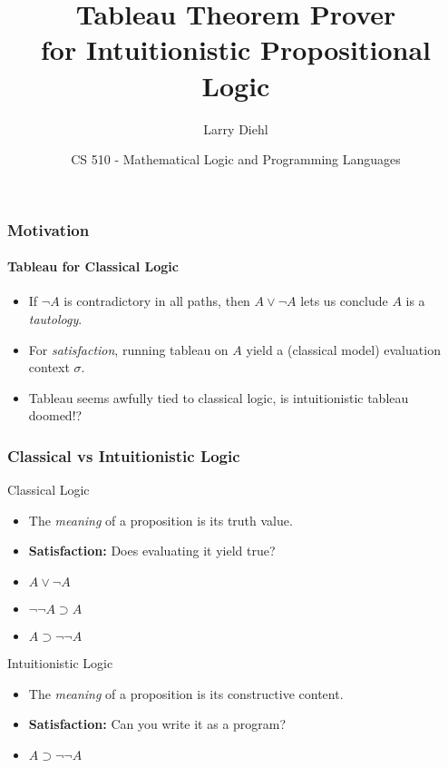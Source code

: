 \documentclass[mathserif]{beamer}
\title{Tableau Theorem Prover\\ for Intuitionistic Propositional Logic}
\author{Larry Diehl}
\institute{Portland State University}
\date[Fall 2014]
{CS 510 - Mathematical Logic and Programming Languages}
\def\imp{\supset}
\begin{document}
\frame{\titlepage}

\begin{frame}
\frametitle{Motivation}
\framesubtitle{Tableau for Classical Logic}

\begin{itemize}
\item If $\neg A$ is contradictory in all paths, then $A \lor \neg A$
  lets us conclude $A$ is a {\it tautology}.
\item For {\it satisfaction}, running tableau on $A$ yield a
  (classical model) evaluation context $\sigma$.
\item Tableau seems awfully tied to classical logic, is intuitionistic
  tableau doomed!?
\end{itemize}



\end{frame}


\begin{frame}
\frametitle{Classical vs Intuitionistic Logic}



\begin{block}{Classical Logic}
\begin{itemize}
\item The {\it meaning} of a proposition is its truth value.
\item {\bf Satisfaction:} Does evaluating it yield true?
\item $A \lor \neg A$
\item $\neg\neg A \imp A$
\item $A \imp \neg\neg A$
\end{itemize}
\end{block}

\begin{block}{Intuitionistic Logic}
\begin{itemize}
\item The {\it meaning} of a proposition is its constructive content.
\item {\bf Satisfaction:} Can you write it as a program?
\item $A \imp \neg\neg A$
\end{itemize}
\end{block}

\end{frame}
\end{document}
